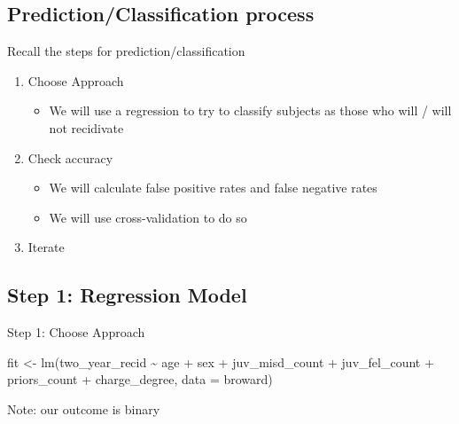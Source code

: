 \documentclass[
  letterpaper,
  DIV=11,
  numbers=noendperiod]{scrreprt}
\newenvironment{Shaded}{\begin{snugshade}}{\end{snugshade}}
\newcommand{\AttributeTok}[1]{\textcolor[rgb]{0.40,0.45,0.13}{#1}}
\newcommand{\FunctionTok}[1]{\textcolor[rgb]{0.28,0.35,0.67}{#1}}
\newcommand{\NormalTok}[1]{\textcolor[rgb]{0.00,0.23,0.31}{#1}}
\newcommand{\OtherTok}[1]{\textcolor[rgb]{0.00,0.23,0.31}{#1}}
\newcommand{\SpecialCharTok}[1]{\textcolor[rgb]{0.37,0.37,0.37}{#1}}
\providecommand{\tightlist}{%
  \setlength{\itemsep}{0pt}\setlength{\parskip}{0pt}}\usepackage{longtable,booktabs,array}
\begin{document}
\hypertarget{predictionclassification-process}{%
\subsection{Prediction/Classification
process}\label{predictionclassification-process}}

Recall the steps for prediction/classification

\begin{enumerate}
\def\labelenumi{\arabic{enumi}.}
\tightlist
\item
  Choose Approach

  \begin{itemize}
  \tightlist
  \item
    We will use a regression to try to classify subjects as those who
    will / will not recidivate
  \end{itemize}
\item
  Check accuracy

  \begin{itemize}
  \tightlist
  \item
    We will calculate false positive rates and false negative rates
  \item
    We will use cross-validation to do so
  \end{itemize}
\item
  Iterate
\end{enumerate}

\hypertarget{step-1-regression-model}{%
\subsection{Step 1: Regression Model}\label{step-1-regression-model}}

Step 1: Choose Approach

\begin{Shaded}
\begin{Highlighting}[]
\NormalTok{fit }\OtherTok{\textless{}{-}} \FunctionTok{lm}\NormalTok{(two\_year\_recid }\SpecialCharTok{\textasciitilde{}}\NormalTok{ age }\SpecialCharTok{+}\NormalTok{ sex }\SpecialCharTok{+}\NormalTok{ juv\_misd\_count }\SpecialCharTok{+}\NormalTok{ juv\_fel\_count }\SpecialCharTok{+} 
\NormalTok{            priors\_count }\SpecialCharTok{+}\NormalTok{ charge\_degree, }
          \AttributeTok{data =}\NormalTok{ broward)}
\end{Highlighting}
\end{Shaded}

Note: our outcome is binary
\end{document}
